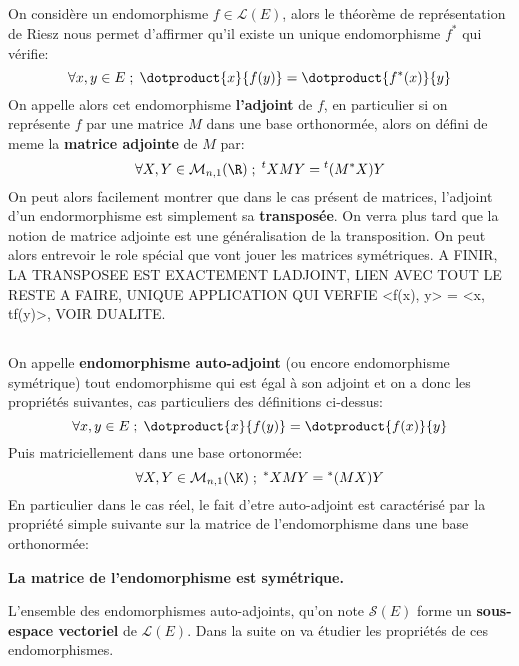 \subsection*{}
On considère un endomorphisme \(f \in \mathcal{L}(E)\), alors le théorème de représentation de Riesz nous permet d'affirmer qu'il existe un unique endomorphisme \(f^*\) qui vérifie:
\[
   \forall x, y \in E \; ; \; \dotproduct{x}{f(y)} = \dotproduct{f^*(x)}{y}   
\]
On appelle alors cet endomorphisme \textbf{l'adjoint} de \(f\), en particulier si on représente \(f\) par une matrice \(M\) dans une base orthonormée, alors on défini de meme la \textbf{matrice adjointe} de \(M\) par:
\[
   \forall X, Y \in \mathcal{M}_{n, 1}(\R) \; ; \; {}^tXMY = {}^t(M^*X)Y  
\] 
On peut alors facilement montrer que dans le cas présent de matrices, l'adjoint d'un endormorphisme est simplement sa \textbf{transposée}. On verra plus tard que la notion de matrice adjointe est une généralisation de la transposition. On peut alors entrevoir le role spécial que vont jouer les matrices symétriques. A FINIR, LA TRANSPOSEE EST EXACTEMENT LADJOINT, LIEN AVEC TOUT LE RESTE A FAIRE, UNIQUE APPLICATION QUI VERFIE <f(x), y> = <x, tf(y)>, VOIR DUALITE.
\subsection*{}
On appelle \textbf{endomorphisme auto-adjoint} (ou encore endomorphisme symétrique) tout endomorphisme qui est égal à son adjoint et on a donc les propriétés suivantes, cas particuliers des définitions ci-dessus:
\[
   \forall x, y \in E \; ; \; \dotproduct{x}{f(y)} = \dotproduct{f(x)}{y}     
\]
Puis matriciellement dans une base ortonormée:
\[
   \forall X, Y \in \mathcal{M}_{n, 1}(\K) \; ; \; {}^*XMY = {}^*(MX)Y  
\]
En particulier dans le cas réel, le fait d'etre auto-adjoint est caractérisé par la propriété simple suivante sur la matrice de l'endomorphisme dans une base orthonormée:
\begin{center}
   \textbf{La matrice de l'endomorphisme est symétrique.}
\end{center}

L'ensemble des endomorphismes auto-adjoints, qu'on note \(\mathcal{S}(E)\) forme un \textbf{sous-espace vectoriel} de \(\mathcal{L}(E)\). Dans la suite on va étudier les propriétés de ces endomorphismes.
